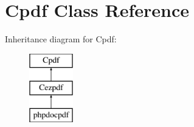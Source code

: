 \hypertarget{class_cpdf}{\section{\-Cpdf \-Class \-Reference}
\label{class_cpdf}
}
\-Inheritance diagram for \-Cpdf\-:\begin{figure}[H]
\begin{center}
\leavevmode
\includegraphics[height=3.000000cm]{class_cpdf}
\end{center}
\end{figure}
